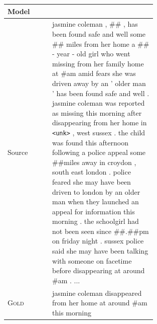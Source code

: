 \documentclass[12pt]{report}
\begin{document}
\begin{figure}[p]
\centering
\begin{tabular}{ll p{0.7\linewidth}}
\toprule
Model & & \\
\midrule
Source & & jasmine coleman , \#\# , has been found safe and well some \#\# miles from her home a \#\# - year - old girl who went missing from her family home at \#am amid fears she was driven away by an ' older man ' has been found safe and well . jasmine coleman was reported as missing this morning after disappearing from her home in \texttt{<unk>} , west sussex . the child was found this afternoon following a police appeal some \#\#miles away in croydon , south east london . police feared she may have been driven to london by an older man when they launched an appeal for information this morning . the schoolgirl had not been seen since \#\#.\#\#pm on friday night . sussex police said she may have been talking with someone on facetime before disappearing at around \#am . ... \\
\midrule
\textsc{Gold} & & jasmine coleman disappeared from her home at around \#am this morning \\

\end{tabular}
\end{figure}
\end{document}
